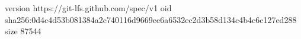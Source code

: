 version https://git-lfs.github.com/spec/v1
oid sha256:0d4c4d53b081384a2c740116d9669ee6a6532ec2d3b58d134c4b4c6c127ed288
size 87544
